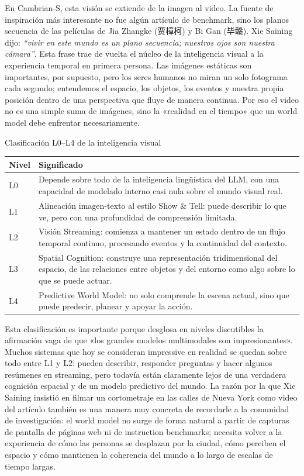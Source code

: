 En Cambrian-S, esta visión se extiende de la imagen al video. La fuente de inspiración más interesante no fue algún artículo de benchmark, sino los planos secuencia de las películas de Jia Zhangke (贾樟柯) y Bi Gan (毕赣). Xie Saining dijo: \textit{``vivir en este mundo es un plano secuencia; nuestros ojos son nuestra cámara''}. Esta frase trae de vuelta el núcleo de la inteligencia visual a la experiencia temporal en primera persona. Las imágenes estáticas son importantes, por supuesto, pero los seres humanos no miran un solo fotograma cada segundo; entendemos el espacio, los objetos, los eventos y nuestra propia posición dentro de una perspectiva que fluye de manera continua. Por eso el video no es una simple suma de imágenes, sino la «realidad en el tiempo» que un world model debe enfrentar necesariamente.

\begin{importantbox}{Clasificación L0--L4 de la inteligencia visual}
\begin{tabularx}{\textwidth}{>{\raggedright\arraybackslash}p{} Y}
\toprule
Nivel & Significado \\
\midrule
L0 & Depende sobre todo de la inteligencia lingüística del LLM, con una capacidad de modelado interno casi nula sobre el mundo visual real. \\
L1 & Alineación imagen-texto al estilo Show \& Tell: puede describir lo que ve, pero con una profundidad de comprensión limitada. \\
L2 & Visión Streaming: comienza a mantener un estado dentro de un flujo temporal continuo, procesando eventos y la continuidad del contexto. \\
L3 & Spatial Cognition: construye una representación tridimensional del espacio, de las relaciones entre objetos y del entorno como algo sobre lo que se puede actuar. \\
L4 & Predictive World Model: no solo comprende la escena actual, sino que puede predecir, planear y apoyar la acción. \\
\bottomrule
\end{tabularx}
\end{importantbox}

Esta clasificación es importante porque desglosa en niveles discutibles la afirmación vaga de que «los grandes modelos multimodales son impresionantes». Muchos sistemas que hoy se consideran impressive en realidad se quedan sobre todo entre L1 y L2: pueden describir, responder preguntas y hacer algunos resúmenes en streaming, pero todavía están claramente lejos de una verdadera cognición espacial y de un modelo predictivo del mundo. La razón por la que Xie Saining insistió en filmar un cortometraje en las calles de Nueva York como video del artículo también es una manera muy concreta de recordarle a la comunidad de investigación: el world model no surge de forma natural a partir de capturas de pantalla de páginas web ni de instruction benchmarks; necesita volver a la experiencia de cómo las personas se desplazan por la ciudad, cómo perciben el espacio y cómo mantienen la coherencia del mundo a lo largo de escalas de tiempo largas.

